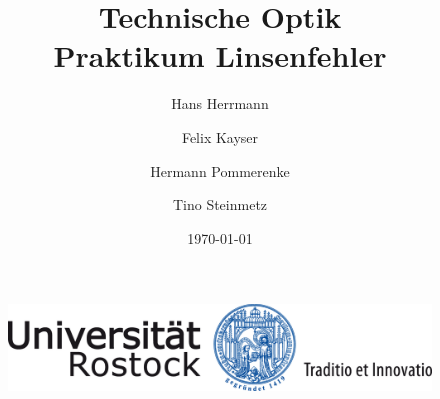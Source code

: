 \documentclass[11pt,fleqn]{article}
\title{Technische Optik \\ Praktikum Linsenfehler}
\date{\today}
\author{Hans Herrmann \and Felix Kayser \and Hermann Pommerenke \and Tino Steinmetz}
\begin{document}
	\begin{figure}[t]
	    \centering
	    \includegraphics[width=115mm]{img/UNI-Logo_Siegel_4c_115mm_07.png}
	\end{figure}

	\maketitle
	
	\thispagestyle{empty}

	\newpage
	\pagestyle{headings}
	\tableofcontents
	
	\everymath{\displaystyle} %
	
	\newpage

	
	
	\clearpage
	
	
	\clearpage
	
	
	\clearpage
	
	
\end{document}
